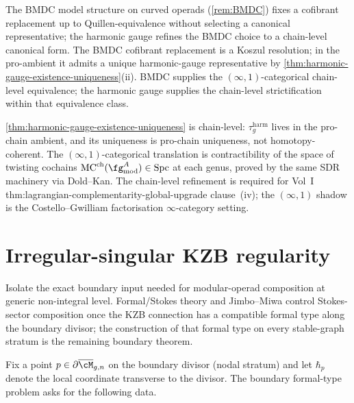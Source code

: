 \begin{remark}
\label{rem:BMDC-gauge-comparison}
The BMDC model structure on curved operads (\autoref{rem:BMDC})
fixes a cofibrant replacement up to Quillen-equivalence without
selecting a canonical representative; the harmonic gauge refines
the BMDC choice to a chain-level canonical form. The BMDC
cofibrant replacement is a Koszul resolution; in the pro-ambient
it admits a unique harmonic-gauge representative by
\autoref{thm:harmonic-gauge-existence-uniqueness}(ii). BMDC
supplies the \((\infty, 1)\)-categorical chain-level equivalence;
the harmonic gauge supplies the chain-level strictification within
that equivalence class.
\end{remark}

\begin{remark}
\label{rem:harmonic-gauge-two-lanes}
\autoref{thm:harmonic-gauge-existence-uniqueness} is chain-level:
\(\tau_{g}^{\mathrm{harm}}\) lives in the pro-chain ambient, and
its uniqueness is pro-chain uniqueness, not homotopy-coherent.
The \((\infty, 1)\)-categorical translation is contractibility of
the space of twisting cochains
\(\mathrm{MC}^{\mathrm{ch}}(\fg^{A}_{\mathrm{mod}}) \in
\mathrm{Spc}\) at each genus, proved by the same SDR machinery
via Dold--Kan. The chain-level refinement is required for Vol~I
\textup{thm:lagrangian-complementarity-global-upgrade}
clause~(iv); the \((\infty, 1)\) shadow is the Costello--Gwilliam
\cite{CG21} factorisation \(\infty\)-category setting.
\end{remark}

\section{Irregular-singular KZB regularity}
\label{sec:jimbo-miwa}

Isolate the exact boundary input needed for modular-operad
composition at generic non-integral level. Formal/Stokes theory and
Jimbo--Miwa control Stokes-sector composition once the KZB
connection has a compatible formal type along the boundary divisor;
the construction of that formal type on every stable-graph stratum
is the remaining boundary theorem.

Fix a point \(p \in \partial\overline{\cM}_{g,n}\) on the boundary
divisor (nodal stratum) and let
\(\hbar_{p}\) denote the local coordinate transverse to the divisor.
The boundary formal-type problem asks for the following data.

